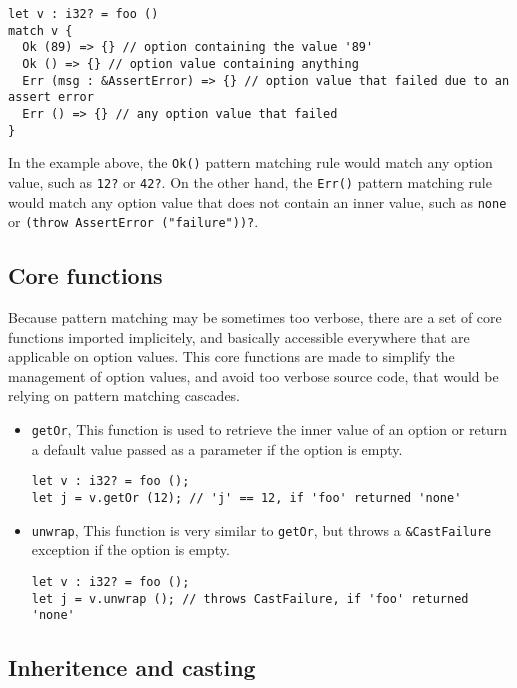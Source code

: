 \begin{lstlisting}[style=coloredverbatim]
let v : i32? = foo ()
match v {
  Ok (89) => {} // option containing the value '89'
  Ok () => {} // option value containing anything
  Err (msg : &AssertError) => {} // option value that failed due to an assert error
  Err () => {} // any option value that failed
}
\end{lstlisting}

In the example above, the \texttt{Ok()} pattern matching rule would match any
option value, such as \texttt{12?} or \texttt{42?}. On the other hand, the
\texttt{Err()} pattern matching rule would match any option value that does not
contain an inner value, such as \texttt{none} or \texttt{(throw AssertError
  ("failure"))?}.

\subsection{Core functions}

Because pattern matching may be sometimes too verbose, there are a set of core
functions imported implicitely, and basically accessible everywhere that are
applicable on option values. This core functions are made to simplify the
management of option values, and avoid too verbose source code, that would be
relying on pattern matching cascades.

\begin{itemize}
\item \texttt{getOr}, This function is used to retrieve the inner value of an
  option or return a default value passed as a parameter if the option is empty.
  \begin{lstlisting}[style=coloredverbatim]
let v : i32? = foo ();
let j = v.getOr (12); // 'j' == 12, if 'foo' returned 'none'
  \end{lstlisting}
\item \texttt{unwrap}, This function is very similar to \texttt{getOr}, but
  throws a \texttt{\&CastFailure} exception if the option is empty.
  \begin{lstlisting}[style=coloredverbatim]
let v : i32? = foo ();
let j = v.unwrap (); // throws CastFailure, if 'foo' returned 'none'
  \end{lstlisting}
\end{itemize}

\subsection{Inheritence and casting}

